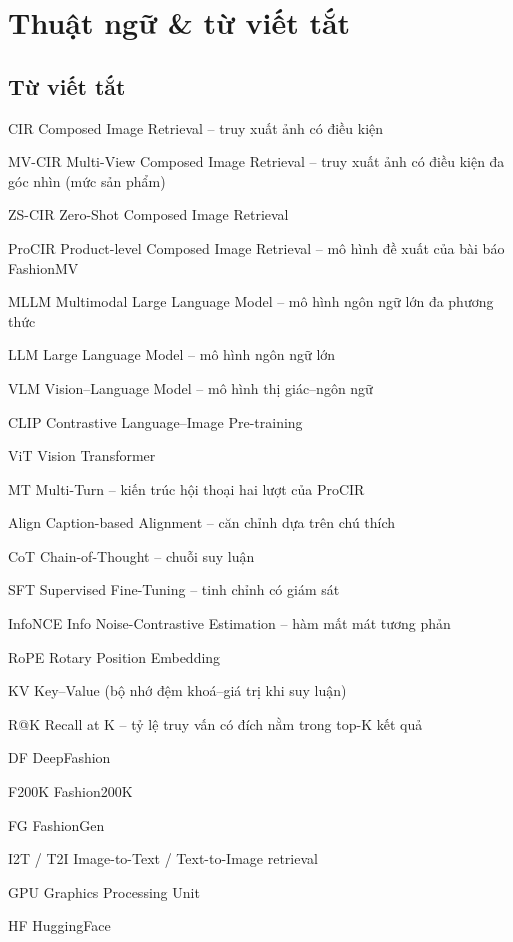 \chapter*{Thuật ngữ \& từ viết tắt}
\vspace{0.5cm}

\section*{Từ viết tắt}
\begin{abbrv}
    \item[CIR] Composed Image Retrieval -- truy xuất ảnh có điều kiện
    \item[MV-CIR] Multi-View Composed Image Retrieval -- truy xuất ảnh có điều kiện đa góc nhìn (mức sản phẩm)
    \item[ZS-CIR] Zero-Shot Composed Image Retrieval
    \item[ProCIR] Product-level Composed Image Retrieval -- mô hình đề xuất của bài báo FashionMV
    \item[MLLM] Multimodal Large Language Model -- mô hình ngôn ngữ lớn đa phương thức
    \item[LLM] Large Language Model -- mô hình ngôn ngữ lớn
    \item[VLM] Vision--Language Model -- mô hình thị giác--ngôn ngữ
    \item[CLIP] Contrastive Language--Image Pre-training
    \item[ViT] Vision Transformer
    \item[MT] Multi-Turn -- kiến trúc hội thoại hai lượt của ProCIR
    \item[Align] Caption-based Alignment -- căn chỉnh dựa trên chú thích
    \item[CoT] Chain-of-Thought -- chuỗi suy luận
    \item[SFT] Supervised Fine-Tuning -- tinh chỉnh có giám sát
    \item[InfoNCE] Info Noise-Contrastive Estimation -- hàm mất mát tương phản
    \item[RoPE] Rotary Position Embedding
    \item[KV] Key--Value (bộ nhớ đệm khoá--giá trị khi suy luận)
    \item[R@K] Recall at K -- tỷ lệ truy vấn có đích nằm trong top-K kết quả
    \item[DF] DeepFashion
    \item[F200K] Fashion200K
    \item[FG] FashionGen
    \item[I2T / T2I] Image-to-Text / Text-to-Image retrieval
    \item[GPU] Graphics Processing Unit
    \item[HF] HuggingFace
\end{abbrv}


